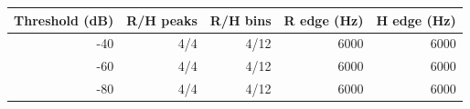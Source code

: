 \begin{tabular}{rrrrr}
\toprule
Threshold (dB) & R/H peaks & R/H bins & R edge (Hz) & H edge (Hz) \\
\midrule
-40 & 4/4 & 4/12 & 6000 & 6000 \\
-60 & 4/4 & 4/12 & 6000 & 6000 \\
-80 & 4/4 & 4/12 & 6000 & 6000 \\
\bottomrule
\end{tabular}
